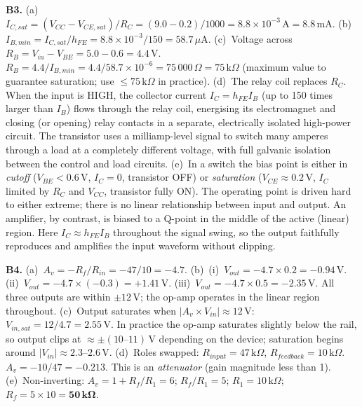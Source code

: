 \textbf{B3.}
(a)~$I_{C,sat}=(V_{CC}-V_{CE,sat})/R_C
=(9.0-0.2)/1000=8.8\times10^{-3}\,\text{A}
=8.8\,\text{mA}$. \quad
(b)~$I_{B,min}=I_{C,sat}/h_{FE}
=8.8\times10^{-3}/150=58.7\,\mu\text{A}$. \quad
(c)~Voltage across $R_B=V_{in}-V_{BE}=5.0-0.6
=4.4\,\text{V}$.
$R_B=4.4/I_{B,min}=4.4/58.7\times10^{-6}
=75\,000\,\Omega=75\,\text{k}\Omega$
(maximum value to guarantee saturation; use
$\leq75\,\text{k}\Omega$ in practice). \quad
(d)~The relay coil replaces $R_C$. When the input
is HIGH, the collector current $I_C=h_{FE}I_B$
(up to 150 times larger than $I_B$) flows through
the relay coil, energising its electromagnet and
closing (or opening) relay contacts in a separate,
electrically isolated high-power circuit. The
transistor uses a milliamp-level signal to switch
many amperes through a load at a completely different
voltage, with full galvanic isolation between
the control and load circuits. \quad
(e)~In a switch the bias point is either in
\textit{cutoff} ($V_{BE}<0.6\,\text{V}$, $I_C=0$,
transistor OFF) or \textit{saturation}
($V_{CE}\approx0.2\,\text{V}$, $I_C$ limited by
$R_C$ and $V_{CC}$, transistor fully ON). The
operating point is driven hard to either extreme;
there is no linear relationship between input and
output. An amplifier, by contrast, is biased to a
Q-point in the middle of the active (linear) region.
Here $I_C\approx h_{FE}I_B$ throughout the signal
swing, so the output faithfully reproduces and
amplifies the input waveform without clipping.

\textbf{B4.}
(a)~$A_v=-R_f/R_{in}=-47/10=-4.7$. \quad
(b)~(i)~$V_{out}=-4.7\times0.2=-0.94\,\text{V}$. \quad
(ii)~$V_{out}=-4.7\times(-0.3)=+1.41\,\text{V}$. \quad
(iii)~$V_{out}=-4.7\times0.5=-2.35\,\text{V}$.
All three outputs are within $\pm12\,\text{V}$;
the op-amp operates in the linear region throughout.
\quad
(c)~Output saturates when $|A_v\times V_{in}|
\approx12\,\text{V}$:
$V_{in,sat}=12/4.7=2.55\,\text{V}$.
In practice the op-amp saturates slightly below the
rail, so output clips at $\approx\pm(10\text{--}11)\,
\text{V}$ depending on the device; saturation begins
around $|V_{in}|\approx2.3$--$2.6\,\text{V}$. \quad
(d)~Roles swapped: $R_{input}=47\,\text{k}\Omega$,
$R_{feedback}=10\,\text{k}\Omega$.
$A_v=-10/47=-0.213$.
This is an \textit{attenuator} (gain magnitude less
than 1). \quad
(e)~Non-inverting: $A_v=1+R_f/R_1=6$;
$R_f/R_1=5$; $R_1=10\,\text{k}\Omega$;
$R_f=5\times10=\mathbf{50\,\text{k}\Omega}$.

